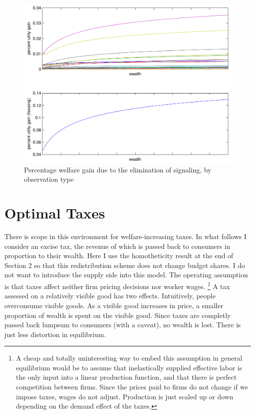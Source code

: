 \documentclass{article}
\begin{document}
\begin{figure}
	\begin{center}
		\includegraphics[scale=.8]{pics/uchnge_cropped.pdf}
	\end{center}
	\caption{Percentage welfare gain due to the elimination of signaling, by observation type}
	\label{fig:uchnge}
\end{figure}

\section{Optimal Taxes}
There is scope in this environment for welfare-increasing taxes.  
In what follows I consider an excise tax, the revenue of which is passed back to consumers in proportion to their wealth.
Here I use the homotheticity result at the end of Section 2 so that this redistribution scheme does not change budget shares.
I do not want to introduce the supply side into this model.
The operating assumption is that taxes affect neither firm pricing decisions nor worker wages.
\footnote{
A cheap and totally uninteresting way to embed this assumption in general equilibrium would be to assume that inelastically supplied effective labor is the only input into a linear production function, and that there is perfect competition between firms.
Since the prices paid to firms do not change if we impose taxes, wages do not adjust.
Production is just scaled up or down depending on the demand effect of the taxes.
}
A tax assessed on a relatively visible good has two effects.
Intuitively, people overconsume visible goods.
As a visible good increases in price, a smaller proportion of wealth is spent on the visible good.
Since taxes are completly passed back lumpsum to consumers (with a caveat), no wealth is lost.
There is just less distortion in equilibrium.
\end{document}
